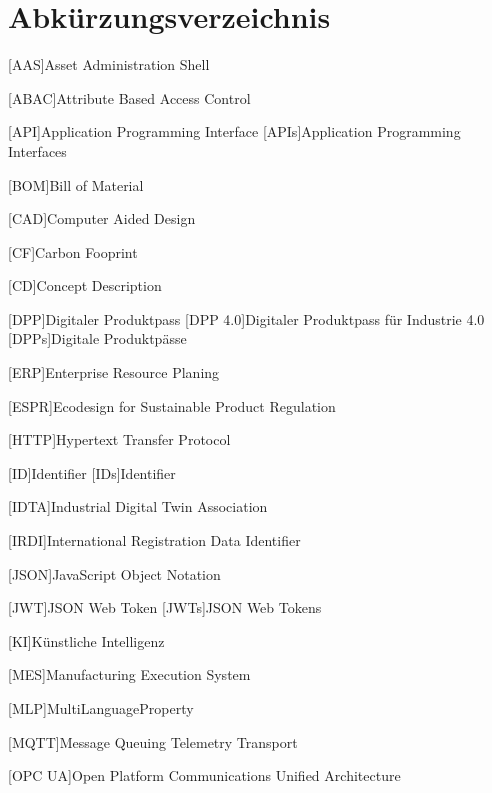 \section*{Abkürzungsverzeichnis}

{

\begin{singlespacing}
\end{singlespacing}
\begin{acronym}

[AAS]{Asset Administration Shell}

[ABAC]{Attribute Based Access Control}

[API]{Application Programming Interface}
[APIs]{Application Programming Interfaces}

[BOM]{Bill of Material}

[CAD]{Computer Aided Design}

[CF]{Carbon Fooprint}

[CD]{Concept Description}

[DPP]{Digitaler Produktpass}
[DPP 4.0]{Digitaler Produktpass für Industrie 4.0}
[DPPs]{Digitale Produktpässe}

[ERP]{Enterprise Resource Planing}

[ESPR]{Ecodesign for Sustainable Product Regulation}

[HTTP]{Hypertext Transfer Protocol}

[ID]{Identifier}
[IDs]{Identifier}

[IDTA]{Industrial Digital Twin Association}

[IRDI]{International Registration Data Identifier}

[JSON]{JavaScript Object Notation}

[JWT]{JSON Web Token}
[JWTs]{JSON Web Tokens}

[KI]{Künstliche Intelligenz}

[MES]{Manufacturing Execution System}

[MLP]{MultiLanguageProperty}

[MQTT]{Message Queuing Telemetry Transport}

[OPC UA]{Open Platform Communications Unified Architecture}


\end{acronym}}
